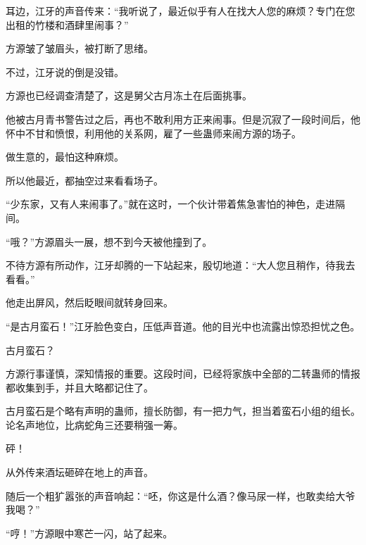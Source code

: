 \begin{this_body}
耳边，江牙的声音传来：“我听说了，最近似乎有人在找大人您的麻烦？专门在您出租的竹楼和酒肆里闹事？”

方源皱了皱眉头，被打断了思绪。

不过，江牙说的倒是没错。

方源也已经调查清楚了，这是舅父古月冻土在后面挑事。

他被古月青书警告过之后，再也不敢利用方正来闹事。但是沉寂了一段时间后，他怀中不甘和愤恨，利用他的关系网，雇了一些蛊师来闹方源的场子。

做生意的，最怕这种麻烦。

所以他最近，都抽空过来看看场子。

“少东家，又有人来闹事了。”就在这时，一个伙计带着焦急害怕的神色，走进隔间。

“哦？”方源眉头一展，想不到今天被他撞到了。

不待方源有所动作，江牙却腾的一下站起来，殷切地道：“大人您且稍作，待我去看看。”

他走出屏风，然后眨眼间就转身回来。

“是古月蛮石！”江牙脸色变白，压低声音道。他的目光中也流露出惊恐担忧之色。

古月蛮石？

方源行事谨慎，深知情报的重要。这段时间，已经将家族中全部的二转蛊师的情报都收集到手，并且大略都记住了。

古月蛮石是个略有声明的蛊师，擅长防御，有一把力气，担当着蛮石小组的组长。论名声地位，比病蛇角三还要稍强一筹。

砰！

从外传来酒坛砸碎在地上的声音。

随后一个粗犷嚣张的声音响起：“呸，你这是什么酒？像马尿一样，也敢卖给大爷我喝？”

“哼！”方源眼中寒芒一闪，站了起来。

\end{this_body}

